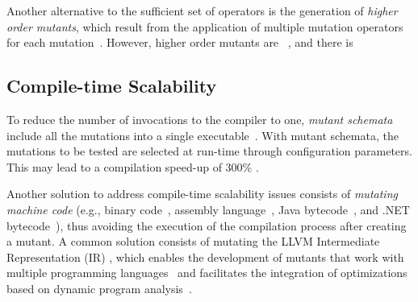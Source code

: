 Another alternative to the sufficient set of operators is the generation of \emph{higher order mutants}, which result from the application of multiple mutation operators for each mutation~\cite{jia2009higher,kintis2010evaluating,offutt1992investigations,papadakis2010empirical}. However, higher order mutants are ~\cite{papadakis2010mutation,papadakis2019mutation}, and there is 



\subsection{Compile-time Scalability}
\label{sec:compile:time}



To reduce the number of invocations to the compiler to one, \emph{mutant schemata} include all the mutations into a single executable~\cite{untch1993mutation}. 
With mutant schemata, the mutations to be tested are selected at run-time through configuration parameters. This may lead to a compilation speed-up of 300\% \cite{papadakis2010automatic}. 


Another solution to address compile-time scalability issues consists of \emph{mutating machine code}  (e.g., binary code~\cite{becker2012xemu}, assembly language~\cite{crouzet2006sesame},
Java bytecode~\cite{ma2006mujava}, 
 and
.NET bytecode~\cite{derezinska2011object}), thus avoiding the execution of the compilation process after creating a mutant. 
A common solution consists of mutating the
 LLVM Intermediate Representation (IR) \cite{hariri2016evaluating}, 
which enables the development of mutants that work with multiple programming languages~\cite{hariri2019comparing} and facilitates the integration of optimizations based on dynamic program analysis~\cite{denisov2018mull}.



